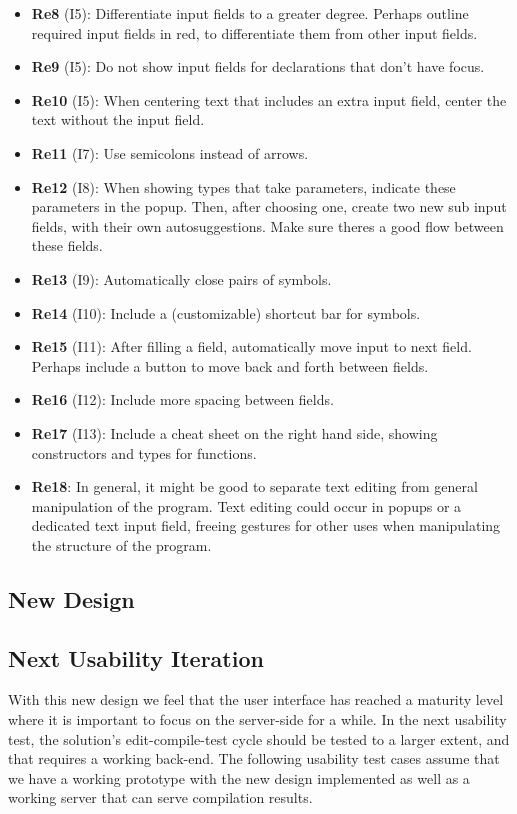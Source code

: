 \begin{itemize}
    \item \textbf{Re8} (I5): Differentiate input fields to a greater degree. Perhaps outline required input fields in red, to differentiate them from other input fields.
    \item \textbf{Re9} (I5): Do not show input fields for declarations that don’t have focus.
    \item \textbf{Re10} (I5): When centering text that includes an extra input field, center the text without the input field. 
    \item \textbf{Re11} (I7): Use semicolons instead of arrows.
    \item \textbf{Re12} (I8): When showing types that take parameters, indicate these parameters in the popup. Then, after choosing one, create two new sub input fields, with their own autosuggestions. Make sure theres a good flow between these fields.
    \item \textbf{Re13} (I9): Automatically close pairs of symbols.
    \item \textbf{Re14} (I10): Include a (customizable) shortcut bar for symbols.
    \item \textbf{Re15} (I11): After filling a field, automatically move input to next field. Perhaps include a button to move back and forth between fields.
    \item \textbf{Re16} (I12): Include more spacing between fields.
    \item \textbf{Re17} (I13): Include a cheat sheet on the right hand side, showing constructors and types for functions.
    \item \textbf{Re18}: In general, it might be good to separate text editing from general manipulation of the program. Text editing could occur in popups or a dedicated text input field, freeing gestures for other uses when manipulating the structure of the program.
\end{itemize}


\subsection{New Design}



\subsection{Next Usability Iteration}
With this new design we feel that the user interface has reached a maturity
level where it is important to focus on the server-side for a while. In the
next usability test, the solution's edit-compile-test cycle should be tested to
a larger extent, and that requires a working back-end. The following usability
test cases assume that we have a working prototype with the new design
implemented as well as a working server that can serve compilation results.

